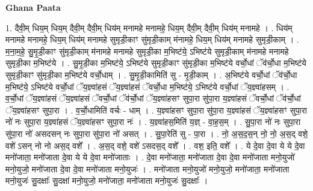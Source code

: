 \documentclass[17pt]{extarticle}
\begin{document}
\textbf{Ghana Paata } \newline

1. दैवी॒म् धिय॒म् धिय॒म् दैवी॒म् दैवी॒म् धिय॑म् मनामहे मनामहे॒ धिय॒म् दैवी॒म् दैवी॒म् धिय॑म् मनामहे । . धिय॑म् मनामहे मनामहे॒ धिय॒म् धिय॑म् मनामहे सुमृडी॒काꣳ सु॑मृडी॒काम् म॑नामहे॒ धिय॒म् धिय॑म् मनामहे सुमृडी॒काम् । . म॒ना॒म॒हे॒ सु॒मृ॒डी॒काꣳ सु॑मृडी॒काम् म॑नामहे मनामहे सुमृडी॒का म॒भिष्ट॑ये॒ ऽभिष्ट॑ये सुमृडी॒काम् म॑नामहे मनामहे सुमृडी॒का म॒भिष्ट॑ये । . सु॒मृ॒डी॒का म॒भिष्ट॑ये॒ ऽभिष्ट॑ये सुमृडी॒काꣳ सु॑मृडी॒का म॒भिष्ट॑ये वर्चो॒धां ॅव॑र्चो॒धा म॒भिष्ट॑ये सुमृडी॒काꣳ सु॑मृडी॒का म॒भिष्ट॑ये वर्चो॒धाम् । . सु॒मृ॒डी॒कामिति॑ सु - मृ॒डी॒काम् । . अ॒भिष्ट॑ये वर्चो॒धां ॅव॑र्चो॒धा म॒भिष्ट॑ये॒ ऽभिष्ट॑ये वर्चो॒धां ॅय॒ज्ञ्वा॑हसं ॅय॒ज्ञ्वा॑हसं ॅवर्चो॒धा म॒भिष्ट॑ये॒ ऽभिष्ट॑ये वर्चो॒धां ॅय॒ज्ञ्वा॑हसम् । . व॒र्चो॒धां ॅय॒ज्ञ्वा॑हसं ॅय॒ज्ञ्वा॑हसं ॅवर्चो॒धां ॅव॑र्चो॒धां ॅय॒ज्ञ्वा॑हसꣳ सुपा॒रा सु॑पा॒रा य॒ज्ञ्वा॑हसं ॅवर्चो॒धां ॅव॑र्चो॒धां ॅय॒ज्ञ्वा॑हसꣳ सुपा॒रा । . व॒र्चो॒धामिति॑ वर्चः - धाम् । . य॒ज्ञ्वा॑हसꣳ सुपा॒रा सु॑पा॒रा य॒ज्ञ्वा॑हसं ॅय॒ज्ञ्वा॑हसꣳ सुपा॒रा नो॑ नः सुपा॒रा य॒ज्ञ्वा॑हसं ॅय॒ज्ञ्वा॑हसꣳ सुपा॒रा नः॑ । . य॒ज्ञ्वा॑हस॒मिति॑ य॒ज्ञ् - वा॒ह॒स॒म् । . सु॒पा॒रा नो॑ नः सुपा॒रा सु॑पा॒रा नो॑ असदसन् नः सुपा॒रा सु॑पा॒रा नो॑ असत् । . सु॒पा॒रेति॑ सु - पा॒रा । . नो॒ अ॒स॒द॒स॒न् नो॒ नो॒ अ॒स॒द् वशे॒ वशे॑ ऽसन् नो नो अस॒द् वशे᳚ । . अ॒स॒द् वशे॒ वशे॑ ऽसदस॒द् वशे᳚ । . वश॒ इति॒ वशे᳚ । . ये दे॒वा दे॒वा ये ये दे॒वा मनो॑जाता॒ मनो॑जाता दे॒वा ये ये दे॒वा मनो॑जाताः । . दे॒वा मनो॑जाता॒ मनो॑जाता दे॒वा दे॒वा मनो॑जाता मनो॒युजो॑ मनो॒युजो॒ मनो॑जाता दे॒वा दे॒वा मनो॑जाता मनो॒युजः॑ । . मनो॑जाता मनो॒युजो॑ मनो॒युजो॒ मनो॑जाता॒ मनो॑जाता मनो॒युजः॑ सु॒दक्षाः᳚ सु॒दक्षा॑ मनो॒युजो॒ मनो॑जाता॒ मनो॑जाता मनो॒युजः॑ सु॒दक्षाः᳚ । \newline
\end{document}
